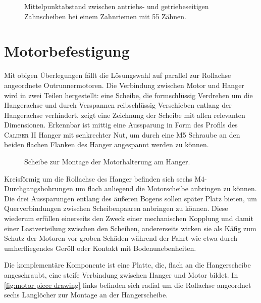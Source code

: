 		\begin{figure}[h]
			\centering
			
			\caption[Mittelpunktabstand zwischen antriebs- und getriebeseitigen Zahnscheiben]{Mittelpunktabstand zwischen antriebs- und getriebeseitigen Zahnscheiben bei einem Zahnriemen mit 55 Zähnen.}
			\label{fig:timing belt length}
		\end{figure}
	\section{Motorbefestigung}\label{sec:motorbefestigung}
		Mit obigen Überlegungen fällt die Lösungswahl auf parallel zur Rollachse angeordnete Outrunnermotoren.
		Die Verbindung zwischen Motor und Hanger wird in zwei Teilen hergestellt: eine Scheibe, die formschlüssig Verdrehen um die Hangerachse und durch Verspannen reibschlüssig Verschieben entlang der Hangerachse verhindert.
		 zeigt eine Zeichnung der Scheibe mit allen relevanten Dimensionen.
		Erkennbar ist mittig eine Aussparung in Form des Profils des \textsc{Caliber II} Hanger mit senkrechter Nut, um durch eine M5 Schraube an den beiden flachen Flanken des Hanger angespannt werden zu können.
		\begin{figure}[h]
			\centering
			
			\caption[Scheibe zur Montage der Motorhalterung am Hanger]{Scheibe zur Montage der Motorhalterung am Hanger.}
			\label{fig:hanger clamp drawing}
		\end{figure}
		Kreisförmig um die Rollachse des Hanger befinden sich sechs M4-Durchgangsbohrungen um flach anliegend die Motorscheibe anbringen zu können.
		Die drei Aussparungen entlang des äußeren Bogens sollen später Platz bieten, um Querverbindungen zwischen Scheibenpaaren anbringen zu können.
		Diese wiederum erfüllen einerseits den Zweck einer mechanischen Kopplung und damit einer Lastverteilung zwischen den Scheiben, andererseits wirken sie als Käfig zum Schutz der Motoren vor groben Schäden während der Fahrt wie etwa durch umherfliegendes Geröll oder Kontakt mit Bodenunebenheiten.\par\medskip
		Die komplementäre Komponente ist eine Platte, die, flach an die Hangerscheibe angeschraubt, eine steife Verbindung zwischen Hanger und Motor bildet.
		In \cref{fig:motor piece drawing} links befinden sich radial um die Rollachse angeordnet sechs Langlöcher zur Montage an der Hangerscheibe.
